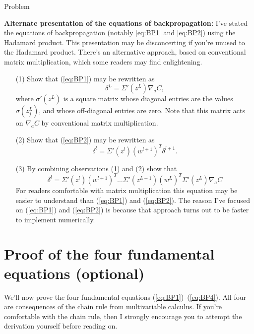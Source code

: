 \documentclass[a4paper,twoside,10pt]{book}
\begin{document}
\begin{exercize}{Problem}
	\item \textbf{Alternate presentation of the equations of backpropagation:} I've stated the equations of backpropagation (notably \ref{eq:BP1} and \ref{eq:BP2}) using the Hadamard product. This presentation may be disconcerting if you're unused to the Hadamard product. There's an alternative approach, based on conventional matrix multiplication, which some readers may find enlightening.
	\begin{enumerate}
		\item[(1)]  Show that (\ref{eq:BP1}) may be rewritten as
		\begin{equation}
			\delta^L = \Sigma'(z^L) \nabla_a C,
			\label{eq:33}
		\end{equation}
		where $\sigma'(z^L)$ is a square matrix whose diagonal entries are the values $\sigma(z^L_j)$, and whose off-diagonal entries are zero. Note that this matrix acts on $\nabla_a C$ by conventional matrix multiplication.
		\item[(2)] Show that (\ref{eq:BP2}) may be rewritten as
		\begin{equation}
			\delta^l = \Sigma'(z^l) (w^{l+1})^T \delta^{l+1}.
			\label{eq:34}
		\end{equation}
		\item[(3)] By combining observations (1) and (2) show that
		\begin{equation}
			\delta^l = \Sigma'(z^l) (w^{l+1})^T \ldots \Sigma'(z^{L-1}) (w^L)^T \Sigma'(z^L) \nabla_a C
			\label{eq:35}
		\end{equation}
		For readers comfortable with matrix multiplication this equation may be easier to understand than (\ref{eq:BP1}) and (\ref{eq:BP2}). The reason I've focused on (\ref{eq:BP1}) and (\ref{eq:BP2}) is because that approach turns out to be faster to implement numerically.
	\end{enumerate}
\end{exercize}
\section{Proof of the four fundamental equations (optional)}
\label{sec:2.5}
We'll now prove the four fundamental equations (\ref{eq:BP1})--(\ref{eq:BP4}). All four are consequences of the chain rule from multivariable calculus. If you're comfortable with the chain rule, then I strongly encourage you to attempt the derivation yourself before reading on.
\end{document}
